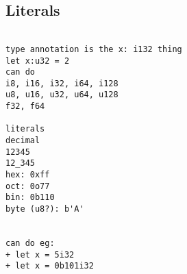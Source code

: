 
\subsection{Literals}

\begin{verbatim}

type annotation is the x: i132 thing
let x:u32 = 2
can do 
i8, i16, i32, i64, i128
u8, u16, u32, u64, u128
f32, f64

literals
decimal
12345
12_345
hex: 0xff
oct: 0o77
bin: 0b110
byte (u8?): b'A'


can do eg:
+ let x = 5i32
+ let x = 0b101i32

\end{verbatim}